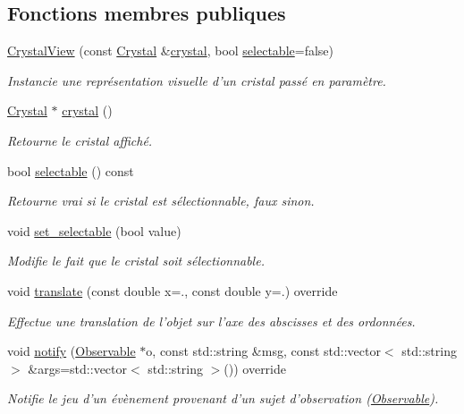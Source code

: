 \subsection*{Fonctions membres publiques}
\begin{DoxyCompactItemize}
\item 
\hyperlink{classCrystalView_a82ec82a190920476f9ae64aca5691ceb}{Crystal\+View} (const \hyperlink{classCrystal}{Crystal} \&\hyperlink{classCrystalView_a0168a3da89580fb0c5467f88c635ac9f}{crystal}, bool \hyperlink{classCrystalView_a6fffe79b15c269a44f9c393ed163f205}{selectable}=false)
\begin{DoxyCompactList}\small\item\em Instancie une représentation visuelle d’un cristal passé en paramètre. \end{DoxyCompactList}\item 
\hyperlink{classCrystal}{Crystal} $\ast$ \hyperlink{classCrystalView_a0168a3da89580fb0c5467f88c635ac9f}{crystal} ()
\begin{DoxyCompactList}\small\item\em Retourne le cristal affiché. \end{DoxyCompactList}\item 
bool \hyperlink{classCrystalView_a6fffe79b15c269a44f9c393ed163f205}{selectable} () const 
\begin{DoxyCompactList}\small\item\em Retourne vrai si le cristal est sélectionnable, faux sinon. \end{DoxyCompactList}\item 
void \hyperlink{classCrystalView_ab2a8ffda8203f9d645fa137ba8542ce4}{set\+\_\+selectable} (bool value)
\begin{DoxyCompactList}\small\item\em Modifie le fait que le cristal soit sélectionnable. \end{DoxyCompactList}\item 
void \hyperlink{classCrystalView_a68f3f631351dce437a2c3ff86385e064}{translate} (const double x=., const double y=.) override
\begin{DoxyCompactList}\small\item\em Effectue une translation de l’objet sur l’axe des abscisses et des ordonnées. \end{DoxyCompactList}\item 
void \hyperlink{classCrystalView_a6dbe86bec06d3b63182804f4f5860054}{notify} (\hyperlink{classObservable}{Observable} $\ast$o, const std\+::string \&msg, const std\+::vector$<$ std\+::string $>$ \&args=std\+::vector$<$ std\+::string $>$()) override
\begin{DoxyCompactList}\small\item\em Notifie le jeu d'un évènement provenant d'un sujet d'observation (\hyperlink{classObservable}{Observable}). \end{DoxyCompactList}\end{DoxyCompactItemize}

